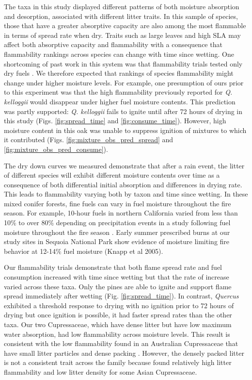 \documentclass[letterpaper,12pt]{article}
\begin{document}
The taxa in this study displayed different patterns of both moisture absorption
and desorption, associated with different litter traits. In this sample of
species, those that have a greater absorptive capacity are also among the most
flammable in terms of spread rate when dry. Traits such as large leaves and
high SLA may affect both absorptive capacity and flammability with a
consequence that flammability rankings across species can change with time
since wetting. One shortcoming of past work in this system was that
flammability trials tested only dry fuels \citep{Magalhaes+Schwilk-2012}. We
therefore expected that rankings of species flammability might change under
higher moisture levels. For example, one presumption of ours prior to this
experiment was that the high flammability previously reported for \emph{Q.
  kelloggii} \citep{Magalhaes+Schwilk-2012} would disappear under higher fuel
moisture contents. This prediction was partly supported: \emph{Q. kelloggii}
fails to ignite until after 72 hours of drying in this study (Figs.
\ref{fig:spread_time} and \ref{fig:consume_time}). However, high moisture
content in this oak was unable to suppress ignition of mixtures to which it
contributed (Figs. \ref{fig:mixture_obs_pred_spread} and
\ref{fig:mixture_obs_pred_consume}).

The dry down curves we measured demonstrate that after a rain event, the litter
of different species will exhibit different moisture contents over time as a
consequence of both differential initial absorption and differences in drying
rate. This leads to flammability varying both by taxon and time since wetting.
In these mixed conifer forests, fine fuels can vary in fuel moisture throughout
the fire season. For example, 10-hour fuels in northern California varied from
less than 10\% to over 80\% depending on precipitation events in a study
following fuel moisture throughout the fire season
\citep{Estes+Knapp+etal-2012}. Early summer prescribed burns at our study sites
in Sequoia National Park show evidence of moisture limiting fire behavior at
12-14\% fuel moisture (Knapp et al 2005).

Our flammability trials demonstrate that both flame spread rate and fuel
consumption increased with time since wetting but that the rate of increase
varied across these taxa. Only the pines are able to ignite and support flame
spread immediately after wetting (Fig. \ref{fig:spread_time}). In contrast,
\emph{Quercus} exhibited a threshold response to drying with no ignition prior
to 72 hours of drying but once ignition is possible, it had faster spread rates
than the other taxa. Our two Cupressaceae, which have dense litter but have low
maximum water absorption, had low flammability across moisture levels. This
result is consistent with the low flammability found in an Australian
Cupressaceae that have small litter particles and dense packing
\citep{Scarff+Westoby-2006, Bowman+Haverkamp+etal-2018}. However, the densely
packed litter is not a consistent trait across the family because
\citet{Cornwell+Elvira+etal-2015} found relatively high litter flammability and
low litter density for some Asian Cupressaceae.
\end{document}
